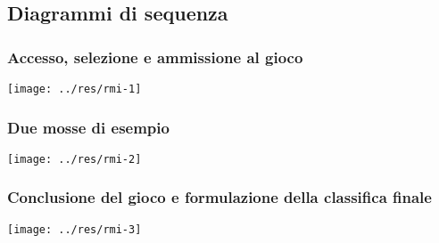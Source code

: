 \documentclass[a4paper,11pt]{article} %
\begin{document}
    \newpage

    \subsection{Diagrammi di sequenza}\label{subsec:diagrammi-di-sequenza2}

    \subsubsection{Accesso, selezione e ammissione al gioco}

    \texttt{[image: ../res/rmi-1]}

    \newpage

    \subsubsection{Due mosse di esempio}

    \texttt{[image: ../res/rmi-2]}

    \newpage

    \subsubsection{Conclusione del gioco e formulazione della classifica finale}

    \texttt{[image: ../res/rmi-3]}

    \newpage
\end{document}
